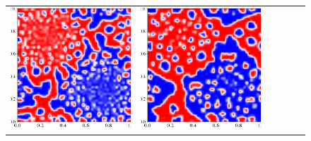 \documentclass[12pt, reqno]{report}
\theoremstyle{definition}
\theoremstyle{remark}
\begin{document}
\begin{figure}[H]
\begin{tabular}{rccccc}
        \includegraphics[align = c, height=\subheight]{media_paper/AC_cmap_MD_n=200.png} & 
        \includegraphics[align = c, height=\subheight]{media_paper/AC_cmap_MD_n=500.png} & 

\end{tabular}
\end{figure}
\end{document}
